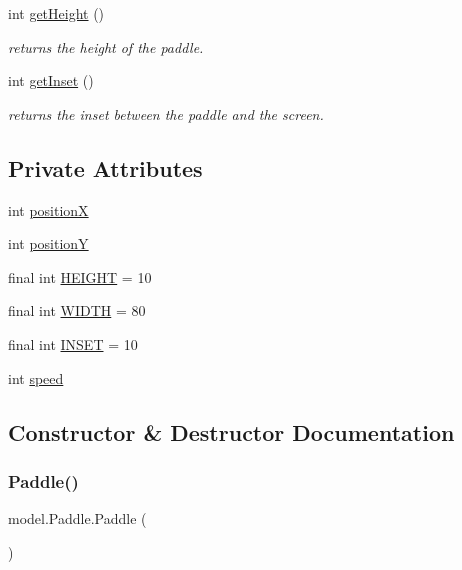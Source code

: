 \begin{DoxyCompactItemize}
int \hyperlink{classmodel_1_1_paddle_a6a997888d6e6fa0586357382b6ef3040}{get\+Height} ()
\begin{DoxyCompactList}\small\item\em returns the height of the paddle. \end{DoxyCompactList}\item 
int \hyperlink{classmodel_1_1_paddle_af9f7a4aa1023dfe606d977b3bafcb4fa}{get\+Inset} ()
\begin{DoxyCompactList}\small\item\em returns the inset between the paddle and the screen. \end{DoxyCompactList}\end{DoxyCompactItemize}
\subsection*{Private Attributes}
\begin{DoxyCompactItemize}
\item 
int \hyperlink{classmodel_1_1_paddle_a18c9d408e60c6651a135f1d86d566a10}{positionX}
\item 
int \hyperlink{classmodel_1_1_paddle_a2eafef3f566f1c9c029c4055865cb8be}{positionY}
\item 
final int \hyperlink{classmodel_1_1_paddle_a2e269d6e61b7b809c3b90c2007994fcf}{H\+E\+I\+G\+HT} = 10
\item 
final int \hyperlink{classmodel_1_1_paddle_a960e83432472e421bd4c5fb3c594e93f}{W\+I\+D\+TH} = 80
\item 
final int \hyperlink{classmodel_1_1_paddle_a4bb13cdef375eba471c680ddc87407ba}{I\+N\+S\+ET} = 10
\item 
int \hyperlink{classmodel_1_1_paddle_a016b48ba6ccdf1cdfc0c11601a6b2a8e}{speed}
\end{DoxyCompactItemize}


\subsection{Constructor \& Destructor Documentation}
\hypertarget{classmodel_1_1_paddle_a31a91190f01435357b55a3d6dc5171f9}{}\label{classmodel_1_1_paddle_a31a91190f01435357b55a3d6dc5171f9} 
\subsubsection{\texorpdfstring{Paddle()}{Paddle()}}
{\footnotesize\ttfamily model.\+Paddle.\+Paddle (\begin{DoxyParamCaption}{ }\end{DoxyParamCaption})}



